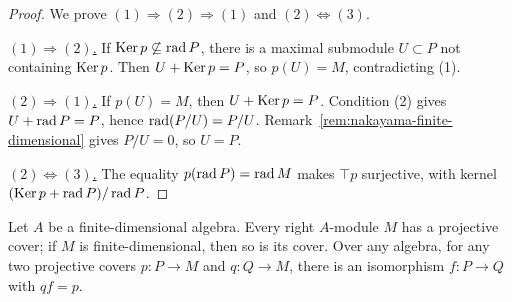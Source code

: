 \begin{proof}
We prove $(1)\Rightarrow(2)\Rightarrow(1)$ and $(2)\Leftrightarrow(3)$.

\underline{$(1)\Rightarrow(2)$.}
If $\operatorname{Ker}\nolimits p\not\subseteq\operatorname{rad}\nolimits P$, there is a maximal submodule $U\subset P$ not containing $\operatorname{Ker}\nolimits p$.
Then $U+\operatorname{Ker}\nolimits p=P$, so $p(U)=M$, contradicting (1).

\underline{$(2)\Rightarrow(1)$.}
If $p(U)=M$, then $U+\operatorname{Ker}\nolimits p=P$.
Condition (2) gives $U+\operatorname{rad}\nolimits P=P$, hence $\operatorname{rad}\nolimits(P/U)=P/U$.
Remark~\ref{rem:nakayama-finite-dimensional} gives $P/U=0$, so $U=P$.

\underline{$(2)\Leftrightarrow(3)$.}
The equality $p(\operatorname{rad}\nolimits P)=\operatorname{rad}\nolimits M$ makes $\top p$ surjective, with kernel
$(\operatorname{Ker}\nolimits p+\operatorname{rad}\nolimits P)/\operatorname{rad}\nolimits P$.
\end{proof}

\begin{theorem}\label{thm:ordinary-projective-covers}
Let $A$ be a finite-dimensional algebra.
Every right $A$-module $M$ has a projective cover; if $M$ is finite-dimensional, then so is its cover.
Over any algebra, for any two projective covers $p:P\to M$ and $q:Q\to M$, there is an isomorphism $f:P\to Q$ with $qf=p$.
\end{theorem}
